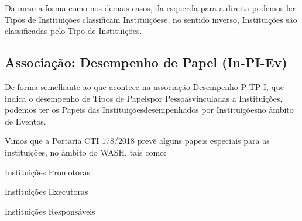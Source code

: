 \documentclass[
12pt,		%
openright,	%
twoside,  %
a4paper,			%
chapter=TITLE,		%
english,			%
french,				%
spanish,			%
brazil				%
]{USPSC-classe/USPSC}
\begin{document}

Da mesma forma como nos demais casos, da esquerda para a direita podemos ler \textquotedbl Tipos de Institui\c{c}\~oes classificam Institui\c{c}\~oes\textquotedbl  e, no sentido inverso, \textquotedbl Institui\c{c}\~oes s\~ao classificadas pelo Tipo de Institui\c{c}\~oes\textquotedbl .










\subsection[Associa\c{c}\~ao: Desempenho de Papel (In-PI-Ev)]{Associa\c{c}\~ao: Desempenho de Papel (In-PI-Ev)}\label{Associa\c{c}\~ao: Desempenho de Papel (In-PI-Ev)}
De forma semelhante ao que acontece na associa\c{c}\~ao \textquotedbl Desempenho P-TP-I\textquotedbl , que indica o desempenho de \textquotedbl Tipos de Papeis\textquotedbl  por \textquotedbl Pessoas\textquotedbl  vinculadas a \textquotedbl Institui\c{c}\~oes\textquotedbl , podemos ter os \textquotedbl Papeis das Institui\c{c}\~oes\textquotedbl  desempenhados por \textquotedbl Institui\c{c}\~oes\textquotedbl  no \^ambito de \textquotedbl Eventos\textquotedbl .










Vimos que a Portaria CTI 178/2018 prev\^e alguns papeis especiais para as institui\c{c}\~oes, no \^ambito do WASH, tais como:











\begin{alineas}
\item Institui\c{c}\~oes Promotoras
\item Institui\c{c}\~oes Executoras
\item Institui\c{c}\~oes Respons\'aveis
\end{alineas}
\end{document}
